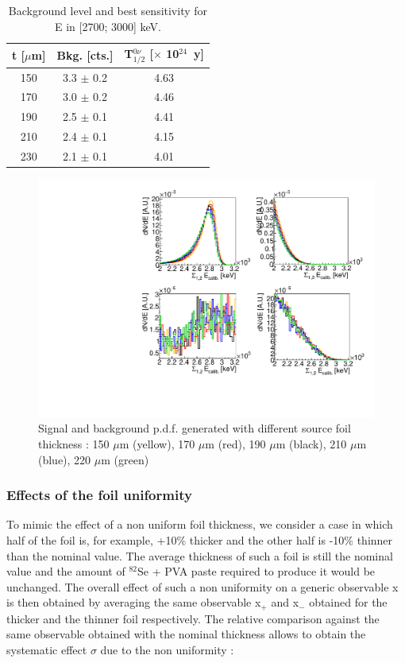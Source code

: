 \documentclass[main.tex]{subfiles}
\begin{document}
\begin{table}
\centering
\begin{tabular}{c|c|c}
\toprule
t [$\mu$m] & Bkg. [cts.] &  T$_{\text{1/2}}^{\text{0}\nu}$ [$\times$ 10$^{\text{24}}$~y] \\[0.1cm]
\hline
150 & 3.3 $\pm$ 0.2 & 4.63 \\[0.1cm]
170 & 3.0 $\pm$ 0.2 & 4.46 \\[0.1cm]
190 & 2.5 $\pm$ 0.1 & 4.41 \\[0.1cm]
210 & 2.4 $\pm$ 0.1 & 4.15 \\[0.1cm]
230 & 2.1 $\pm$ 0.1 & 4.01 \\[0.1cm]
\bottomrule
\end{tabular}
\caption{Background level and best sensitivity for E in [2700; 3000] keV.}
\label{Tab:ThicknessInfluence}
\end{table}


\begin{figure}[h!]
\centering
\includegraphics[scale=0.7]{pictures/Chap4/thickness.pdf}
\caption{Signal and background p.d.f. generated with different source foil thickness : 150 $\mu$m (yellow), 170 $\mu$m (red), 190 $\mu$m (black), 210 $\mu$m (blue), 220 $\mu$m (green)}
\label{ThicknessSourceFoil}
\end{figure}

\FloatBarrier


\subsubsection{Effects of the foil uniformity}


\NI To mimic the effect of a non uniform foil thickness, we consider a case in which half of the foil is, for example, +10\% thicker and the other half is -10\% thinner than the nominal value. The average thickness of such a foil is still the nominal value and the amount of $^{\text{82}}$Se + PVA paste required to produce it would be unchanged. The overall effect of such a non uniformity on a generic observable x is then obtained by averaging the same observable x$_+$ and x$_-$ obtained for the thicker and the thinner foil respectively. The relative comparison against the same observable obtained with the nominal thickness allows to obtain the systematic effect $\sigma$ due to the non uniformity :
\end{document}
